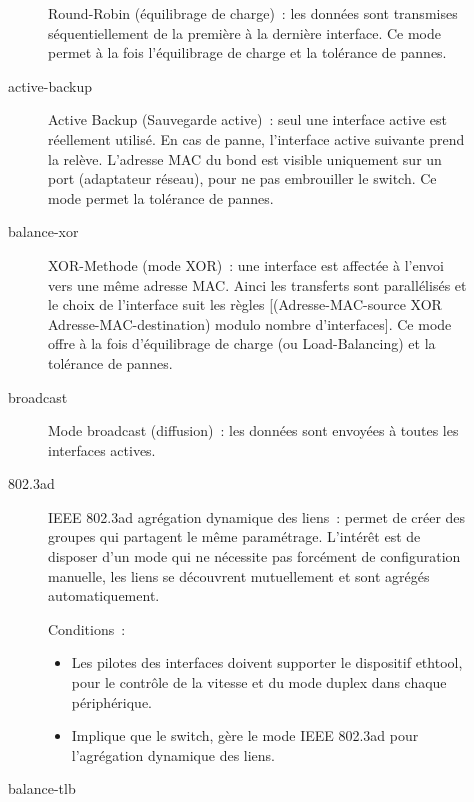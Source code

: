 \begin{description}
\begin{description}
  Round-Robin (équilibrage de charge)~: les données sont transmises séquentiellement
  de la première à la dernière interface. Ce mode permet à la fois l'équilibrage
  de charge et la tolérance de pannes.

\item [active-backup]

  Active Backup (Sauvegarde active)~: seul une interface active est réellement
  utilisé. En cas de panne, l'interface active suivante prend la relève. L'adresse
  MAC du bond est visible uniquement sur un port (adaptateur réseau), pour ne
  pas embrouiller le switch. Ce mode permet la tolérance de pannes.

\item [balance-xor]

  XOR-Methode (mode XOR)~: une interface est affectée à l'envoi vers une même
  adresse MAC. Ainci les transferts sont parallélisés et le choix de l'interface
  suit les règles [(Adresse-MAC-source XOR Adresse-MAC-destination) modulo nombre
  d'interfaces]. Ce mode offre à la fois d'équilibrage de charge
  (ou Load-Balancing) et la tolérance de pannes.

\item [broadcast]

  Mode broadcast (diffusion)~: les données sont envoyées à toutes les interfaces actives.

\item [802.3ad]

  IEEE 802.3ad agrégation dynamique des liens~: permet de créer des groupes qui partagent
  le même paramétrage. L'intérêt est de disposer d'un mode qui ne nécessite pas forcément
  de configuration manuelle, les liens se découvrent mutuellement et sont agrégés
  automatiquement.

  Conditions~:

  \begin{itemize}

    \item Les pilotes des interfaces doivent supporter le dispositif ethtool,
          pour le contrôle de la vitesse et du mode duplex dans chaque périphérique.

    \item Implique que le switch, gère le mode IEEE 802.3ad pour l'agrégation
          dynamique des liens.

  \end{itemize}

\item [balance-tlb]


\end{description}
\end{description}
